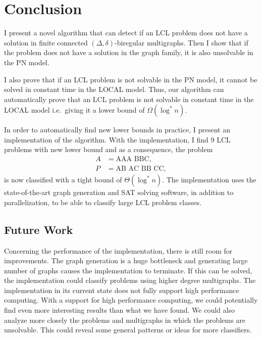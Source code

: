 
\section{Conclusion} \label{sec:conclusion}

I present a novel algorithm that can detect if an LCL problem does not have a solution in finite connected $(\Delta, \delta)$-biregular multigraphs.
Then I show that if the problem does not have a solution in the graph family, it is also unsolvable in the PN model.

I also prove that if an LCL problem is not solvable in the PN model, it cannot be solved in constant time in the LOCAL model.
Thus, our algorithm can automatically prove that an LCL problem is not solvable in constant time in the LOCAL model i.e.\ giving it a lower bound of $\Omega(\log^* n)$.

In order to automatically find new lower bounds in practice, I present an implementation of the algorithm.
With the implementation, I find 9 LCL problems with new lower bound and as a consequence, the problem
\begin{align*}
    A&=\text{AAA BBC},\\
    P&=\text{AB AC BB CC},
\end{align*}
is now classified with a tight bound of $\Theta(\log^* n)$.
The implementation uses the state-of-the-art graph generation and SAT solving software, in addition to parallelization, to be able to classify large LCL problem classes.

\subsection{Future Work}

Concerning the performance of the implementation, there is still room for improvements.
The graph generation is a huge bottleneck and generating large number of graphs causes the implementation to terminate.
If this can be solved, the implementation could classify problems using higher degree multigraphs.
The implementation in its current state does not fully support high performance computing.
With a support for high performance computing, we could potentially find even more interesting results than what we have found.
We could also analyze more closely the problems and multigraphs in which the problems are unsolvable.
This could reveal some general patterns or ideas for more classifiers.
